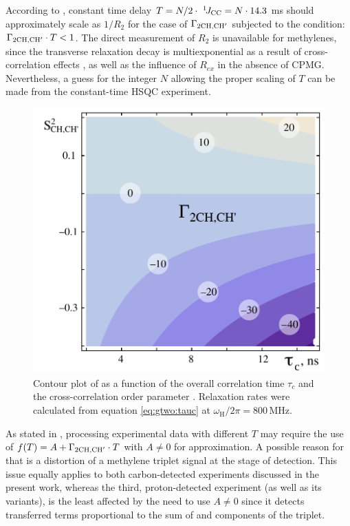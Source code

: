 \documentclass[twocolumn]{svjour3}           %
\begin{document}
According to \cite{carlomagno_errors_2000}, constant time delay 
$T = N/2\cdot~^1\!J_{\text{CC}} = N\cdot 14.3$ ms should approximately scale as 
$1/R_2$ for the case of  $\Gamma_{\text{2CH,CH}'}$ subjected to the condition: 
$\Gamma_{\text{2CH,CH}'}\cdot T < 1$. The direct measurement of $R_2$ is unavailable 
for methylenes, since the \clab{} transverse relaxation decay is 
multiexponential as a result of cross-correlation
effects \cite{yang_probing_2011}, as well as the influence of $R_{ex}$ in the absence of {CPMG}. Nevertheless, a guess for the integer  $N$ allowing the proper scaling of $T$ can be made from the constant-time \clab{} {HSQC} experiment.

\begin{figure}
    \includegraphics[width=\columnwidth]{Fig4_tc.pdf}
    \caption{
    Contour plot of 
    \gtwoCH{} as a function of the overall correlation time $ \tau_c $ 
    and the cross-correlation order parameter \StwoCH{}. Relaxation rates 
    were calculated from equation \eqref{eq:gtwo:tauc} at $\omega_\text{H}/2 \pi = 800\,\text{MHz}$.}
    \label{fig:g2contours}
\end{figure}

As stated in \cite{carlomagno_errors_2000}, processing experimental data with different $T$ may require the use of $f(T) = A + \Gamma_{\text{2CH,CH}'}\cdot T$ with $A \ne 0$ for approximation. A possible reason for that is a distortion of a methylene \clab{} triplet signal 
at the stage of detection. This issue equally applies to both
carbon-detected experiments discussed in the present work, whereas the
third, proton-detected experiment (as well as its variants), is the 
least affected by the need to use $A \ne 0$ since it detects 
transferred terms proportional to the sum of \qinner{} and 
\qouter{} components of the triplet. 
\end{document}
